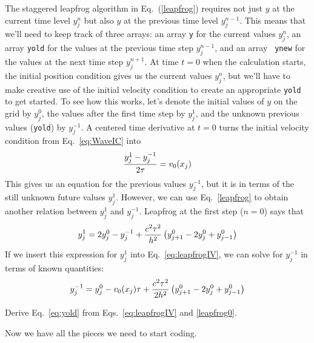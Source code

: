 The staggered leapfrog algorithm in Eq.~(\ref{leapfrog})
requires not just $y$ at the current time level $y_j^n$ but
also $y$ at the previous time level $y_j^{n-1}$. This means
that we'll need to keep track of three arrays: an array {\tt y}
for the current values $y_j^{n}$, an array {\tt yold} for the
values at the previous time step $y_j^{n-1}$, and an array {\tt
ynew} for the values at the next time step $y_j^{n+1}$. At time
$t=0$ when the calculation starts, the initial position
condition gives us the current values $y_j^{n}$, but we'll have
to make creative use of the initial velocity condition to
create an appropriate {\tt yold} to get started. To see how
this works, let's denote the initial values of $y$ on the grid
by $y_j^0$, the values after the first time step by $y_j^1$,
and the unknown previous values ({\tt yold}) by $y_j^{-1}$. A
centered time derivative at $t=0$ turns the initial velocity
condition from Eq.~\eqref{eq:WaveIC} into
\begin{equation}\label{eq:leapfrogIV}
    {y_j^1-y_j^{-1} \over 2 \tau} = v_0(x_j)
\end{equation}
This gives us an equation for the previous values $y_j^{-1}$,
but it is in terms of the still unknown future values
$y_j^{1}$. However, we can use Eq.~\eqref{leapfrog} to obtain
another relation between $y_j^1$ and $y_j^{-1}$. Leapfrog at
the first step ($n=0$) says that
\begin{equation}
    y_j^{1} = 2 y_j^0 - y_j^{-1} + {c^2 \tau^2 \over h^2}
    \left( y^0_{j+1} - 2 y^0_{j} +  y^0_{j-1}
    \right)
    \label{leapfrog0}
\end{equation}
If we insert this expression for $y_j^1$ into
Eq.~\eqref{eq:leapfrogIV}, we can solve for $y_j^{-1}$ in terms of
known quantities:
\begin{equation}\label{eq:yold}
    y_j^{-1}=y_j^0-v_0(x_j) \tau +
    {c^2 \tau^2 \over 2 h^2}
    \left( y^0_{j+1} - 2 y^0_{j} +  y^0_{j-1} \right)
\end{equation}

\begin{enumerate}
\probtwo \label{P:13.2} Derive Eq.~\eqref{eq:yold} from
Eqs.~\eqref{eq:leapfrogIV} and \eqref{leapfrog0}.
\end{enumerate}

Now we have all the pieces we need to start coding.



